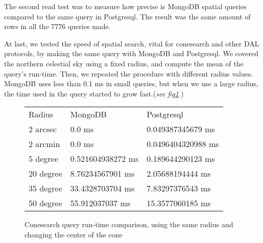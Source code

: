 \documentclass[11pt,twoside]{article}
\begin{document}
    The second read test was to measure how precise is MongoDB spatial queries
    compared to the same query in Postgresql.
    The result was the same amount of rows in all the 7776 queries made.
                
    At last, we tested the speed of spatial search, vital for conesearch and
    other DAL protocols, by making the same query with MongoDB 
    and Postgresql. We covered the northern celestial sky using a fixed radius,
    and compute the mean of the query's run-time. Then, we repeated the
    procedure with different radius values. MongoDB uses less than 0.1 ms in small queries, 
    but when we use a large radius, the time used
    in the query started to grow fast.(\emph{see fig\ref{fig:cone}.})
\begin{figure}
\centering

\begin{tabular}{lll}
 Radius &MongoDB &Postgresql\\
2 arcsec&0.0 ms &0.049387345679 ms\\
2 arcmin&0.0 ms &0.0496404320988 ms\\
5 degree&0.521604938272 ms&0.189644290123 ms\\ 
20 degree &8.76234567901 ms&2.05688194444 ms\\
35 degree &33.4328703704 ms& 7.83297376543 ms\\
50 degree & 55.912037037 ms&15.3577060185 ms
\end{tabular}


\caption{Conesearch query run-time comparison, using the same radius and changing the center of the cone}
\label{fig:cone}
\end{figure}    
\end{document}
